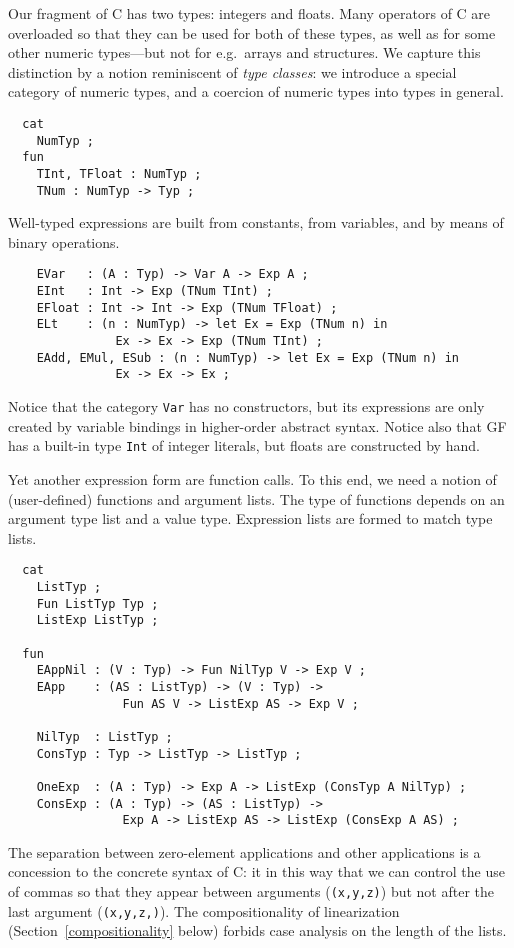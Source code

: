 \documentclass[12pt]{article}
\newcommand{\HOAS}{higher-order abstract syntax}
\newcommand{\empha}[1]{{\em #1}}
\begin{document}
Our fragment of C has two types: integers and floats.
Many operators of C are overloaded so that they can
be used for both of these types, as well as for
some other numeric types---but not for e.g.\ arrays
and structures. We capture this distinction by a notion
reminiscent of \empha{type classes}: we introduce a special
category of numeric types, and a coercion of numeric types
into types in general.
\begin{verbatim}
  cat 
    NumTyp ;
  fun
    TInt, TFloat : NumTyp ;
    TNum : NumTyp -> Typ ;  
\end{verbatim}
Well-typed expressions are built from constants,
from variables, and by means of binary operations.
\begin{verbatim}
    EVar   : (A : Typ) -> Var A -> Exp A ;
    EInt   : Int -> Exp (TNum TInt) ;
    EFloat : Int -> Int -> Exp (TNum TFloat) ;
    ELt    : (n : NumTyp) -> let Ex = Exp (TNum n) in 
               Ex -> Ex -> Exp (TNum TInt) ;
    EAdd, EMul, ESub : (n : NumTyp) -> let Ex = Exp (TNum n) in 
               Ex -> Ex -> Ex ;
\end{verbatim}
Notice that the category \texttt{Var} has no constructors,
but its expressions are only created by
variable bindings in \HOAS. 
Notice also that GF has a built-in type \texttt{Int} of
integer literals, but floats are constructed by hand.

Yet another expression form are function calls. To this
end, we need a notion of (user-defined) functions and
argument lists. The type of functions depends on an
argument type list and a value type. Expression lists
are formed to match type lists.
\begin{verbatim}
  cat
    ListTyp ;
    Fun ListTyp Typ ;
    ListExp ListTyp ;

  fun
    EAppNil : (V : Typ) -> Fun NilTyp V -> Exp V ;
    EApp    : (AS : ListTyp) -> (V : Typ) -> 
                Fun AS V -> ListExp AS -> Exp V ;

    NilTyp  : ListTyp ;
    ConsTyp : Typ -> ListTyp -> ListTyp ;

    OneExp  : (A : Typ) -> Exp A -> ListExp (ConsTyp A NilTyp) ;
    ConsExp : (A : Typ) -> (AS : ListTyp) -> 
                Exp A -> ListExp AS -> ListExp (ConsExp A AS) ;
\end{verbatim}
The separation between zero-element applications and other
applications is a concession to the concrete syntax of C:
it in this way that we can control the use of commas so that
they appear between arguments (\texttt{(x,y,z)}) but not
after the last argument (\texttt{(x,y,z,)}).
The compositionality of linearization (Section~\ref{compositionality} below)
forbids case analysis on the length of the lists.
\end{document}
